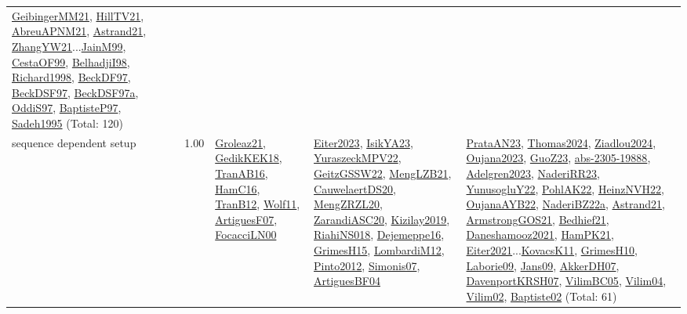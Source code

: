 {\begin{longtable}{p{3cm}r>{\raggedright\arraybackslash}p{6cm}>{\raggedright\arraybackslash}p{6cm}>{\raggedright\arraybackslash}p{8cm}}
\hyperref[detail:GeibingerMM21]{GeibingerMM21}, \hyperref[detail:HillTV21]{HillTV21}, \hyperref[detail:AbreuAPNM21]{AbreuAPNM21}, \hyperref[detail:Astrand21]{Astrand21}, \hyperref[detail:ZhangYW21]{ZhangYW21}...\hyperref[detail:JainM99]{JainM99}, \hyperref[detail:CestaOF99]{CestaOF99}, \hyperref[detail:BelhadjiI98]{BelhadjiI98}, \hyperref[detail:Richard1998]{Richard1998}, \hyperref[detail:BeckDF97]{BeckDF97}, \hyperref[detail:BeckDSF97]{BeckDSF97}, \hyperref[detail:BeckDSF97a]{BeckDSF97a}, \hyperref[detail:OddiS97]{OddiS97}, \hyperref[detail:BaptisteP97]{BaptisteP97}, \hyperref[detail:Sadeh1995]{Sadeh1995} (Total: 120)\\
\index{sequence dependent setup}\index{Concepts!sequence dependent setup}sequence dependent setup &  1.00 & \hyperref[detail:Groleaz21]{Groleaz21}, \hyperref[detail:GedikKEK18]{GedikKEK18}, \hyperref[detail:TranAB16]{TranAB16}, \hyperref[detail:HamC16]{HamC16}, \hyperref[detail:TranB12]{TranB12}, \hyperref[detail:Wolf11]{Wolf11}, \hyperref[detail:ArtiguesF07]{ArtiguesF07}, \hyperref[detail:FocacciLN00]{FocacciLN00} & \hyperref[detail:Eiter2023]{Eiter2023}, \hyperref[detail:IsikYA23]{IsikYA23}, \hyperref[detail:YuraszeckMPV22]{YuraszeckMPV22}, \hyperref[detail:GeitzGSSW22]{GeitzGSSW22}, \hyperref[detail:MengLZB21]{MengLZB21}, \hyperref[detail:CauwelaertDS20]{CauwelaertDS20}, \hyperref[detail:MengZRZL20]{MengZRZL20}, \hyperref[detail:ZarandiASC20]{ZarandiASC20}, \hyperref[detail:Kizilay2019]{Kizilay2019}, \hyperref[detail:RiahiNS018]{RiahiNS018}, \hyperref[detail:Dejemeppe16]{Dejemeppe16}, \hyperref[detail:GrimesH15]{GrimesH15}, \hyperref[detail:LombardiM12]{LombardiM12}, \hyperref[detail:Pinto2012]{Pinto2012}, \hyperref[detail:Simonis07]{Simonis07}, \hyperref[detail:ArtiguesBF04]{ArtiguesBF04} & \hyperref[detail:PrataAN23]{PrataAN23}, \hyperref[detail:Thomas2024]{Thomas2024}, \hyperref[detail:Ziadlou2024]{Ziadlou2024}, \hyperref[detail:Oujana2023]{Oujana2023}, \hyperref[detail:GuoZ23]{GuoZ23}, \hyperref[detail:abs-2305-19888]{abs-2305-19888}, \hyperref[detail:Adelgren2023]{Adelgren2023}, \hyperref[detail:NaderiRR23]{NaderiRR23}, \hyperref[detail:YunusogluY22]{YunusogluY22}, \hyperref[detail:PohlAK22]{PohlAK22}, \hyperref[detail:HeinzNVH22]{HeinzNVH22}, \hyperref[detail:OujanaAYB22]{OujanaAYB22}, \hyperref[detail:NaderiBZ22a]{NaderiBZ22a}, \hyperref[detail:Astrand21]{Astrand21}, \hyperref[detail:ArmstrongGOS21]{ArmstrongGOS21}, \hyperref[detail:Bedhief21]{Bedhief21}, \hyperref[detail:Daneshamooz2021]{Daneshamooz2021}, \hyperref[detail:HamPK21]{HamPK21}, \hyperref[detail:Eiter2021]{Eiter2021}...\hyperref[detail:KovacsK11]{KovacsK11}, \hyperref[detail:GrimesH10]{GrimesH10}, \hyperref[detail:Laborie09]{Laborie09}, \hyperref[detail:Jans09]{Jans09}, \hyperref[detail:AkkerDH07]{AkkerDH07}, \hyperref[detail:DavenportKRSH07]{DavenportKRSH07}, \hyperref[detail:VilimBC05]{VilimBC05}, \hyperref[detail:Vilim04]{Vilim04}, \hyperref[detail:Vilim02]{Vilim02}, \hyperref[detail:Baptiste02]{Baptiste02} (Total: 61)\\

\end{longtable}}
